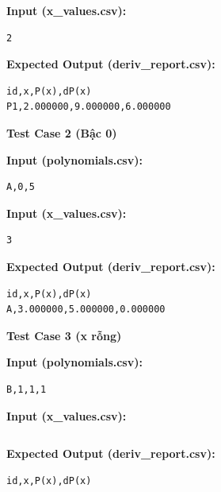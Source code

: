 \textbf{Input (x\_values.csv):}
\begin{lstlisting}
2
\end{lstlisting}

\textbf{Expected Output (deriv\_report.csv):}
\begin{lstlisting}
id,x,P(x),dP(x)
P1,2.000000,9.000000,6.000000
\end{lstlisting}

\vspace{0.5cm}

\textbf{Test Case 2 (Bậc 0)}

\textbf{Input (polynomials.csv):}
\begin{lstlisting}
A,0,5
\end{lstlisting}

\textbf{Input (x\_values.csv):}
\begin{lstlisting}
3
\end{lstlisting}

\textbf{Expected Output (deriv\_report.csv):}
\begin{lstlisting}
id,x,P(x),dP(x)
A,3.000000,5.000000,0.000000
\end{lstlisting}

\vspace{0.5cm}

\textbf{Test Case 3 (x rỗng)}

\textbf{Input (polynomials.csv):}
\begin{lstlisting}
B,1,1,1
\end{lstlisting}

\textbf{Input (x\_values.csv):}
\begin{lstlisting}

\end{lstlisting}

\textbf{Expected Output (deriv\_report.csv):}
\begin{lstlisting}
id,x,P(x),dP(x)
\end{lstlisting}